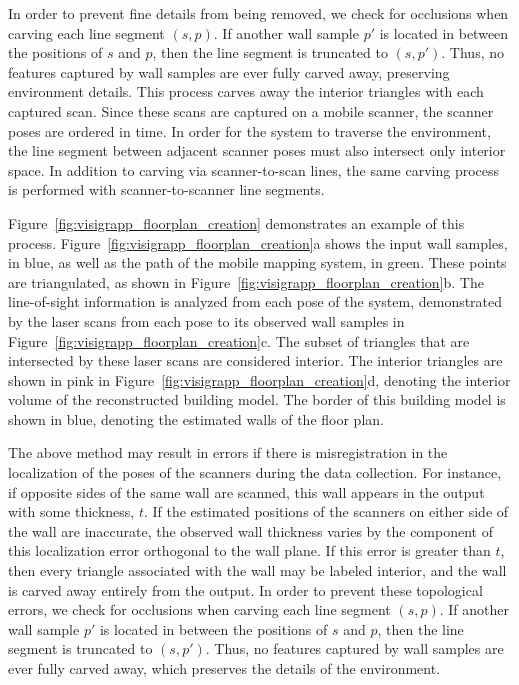 \documentclass[12pt,onecolumn,oneside]{book}
\begin{document}
In order to prevent fine details from being removed, we check for occlusions when carving each line segment $(s,p)$.  If another wall sample $p'$ is located in between the positions of $s$ and $p$, then the line segment is truncated to $(s,p')$.  Thus, no features captured by wall samples are ever fully carved away, preserving environment details.  This process carves away the interior triangles with each captured scan.  Since these scans are captured on a mobile scanner, the scanner poses are ordered in time.  In order for the system to traverse the environment, the line segment between adjacent scanner poses must also intersect only interior space.  In addition to carving via scanner-to-scan lines, the same carving process is performed with scanner-to-scanner line segments.

Figure~\ref{fig:visigrapp_floorplan_creation} demonstrates an example of this process.  Figure~\ref{fig:visigrapp_floorplan_creation}a shows the input wall samples, in blue, as well as the path of the mobile mapping system, in green.  These points are triangulated, as shown in Figure~\ref{fig:visigrapp_floorplan_creation}b.  The line-of-sight information is analyzed from each pose of the system, demonstrated by the laser scans from each pose to its observed wall samples in Figure~\ref{fig:visigrapp_floorplan_creation}c.  The subset of triangles that are intersected by these laser scans are considered interior.  The interior triangles are shown in pink in Figure~\ref{fig:visigrapp_floorplan_creation}d, denoting the interior volume of the reconstructed building model.  The border of this building model is shown in blue, denoting the estimated walls of the floor plan.

The above method may result in errors if there is misregistration in the localization of the poses of the scanners during the data collection.  For instance, if opposite sides of the same wall are scanned, this wall appears in the output with some thickness, $t$.  If the estimated positions of the scanners on either side of the wall are inaccurate, the observed wall thickness varies by the component of this localization error orthogonal to the wall plane.  If this error is greater than $t$, then every triangle associated with the wall may be labeled interior, and the wall is carved away entirely from the output.  In order to prevent these topological errors, we check for occlusions when carving each line segment $(s,p)$.  If another wall sample $p'$ is located in between the positions of $s$ and $p$, then the line segment is truncated to $(s,p')$.  Thus, no features captured by wall samples are ever fully carved away, which preserves the details of the environment.
\end{document}

